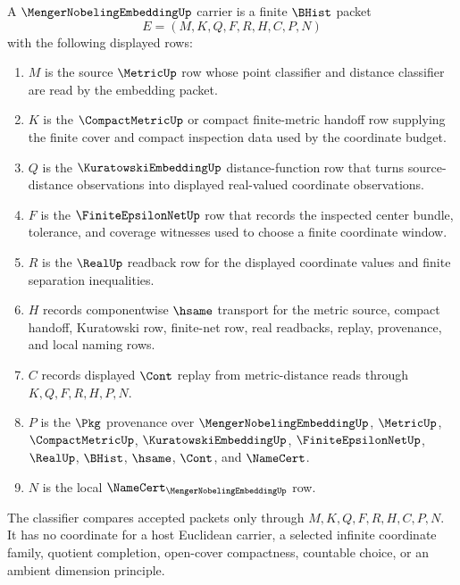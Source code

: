 \begin{definition}
\label{def:menger-nobeling-embedding-carrier}
A $\MengerNobelingEmbeddingUp$ carrier is a finite $\BHist$ packet
$$
E=(M,K,Q,F,R,H,C,P,N)
$$
with the following displayed rows:
\begin{enumerate}
\item $M$ is the source $\MetricUp$ row whose point classifier and distance classifier are read by the embedding packet.
\item $K$ is the $\CompactMetricUp$ or compact finite-metric handoff row supplying the finite cover and compact inspection data used by the coordinate budget.
\item $Q$ is the $\KuratowskiEmbeddingUp$ distance-function row that turns source-distance observations into displayed real-valued coordinate observations.
\item $F$ is the $\FiniteEpsilonNetUp$ row that records the inspected center bundle, tolerance, and coverage witnesses used to choose a finite coordinate window.
\item $R$ is the $\RealUp$ readback row for the displayed coordinate values and finite separation inequalities.
\item $H$ records componentwise $\hsame$ transport for the metric source, compact handoff, Kuratowski row, finite-net row, real readbacks, replay, provenance, and local naming rows.
\item $C$ records displayed $\Cont$ replay from metric-distance reads through $K,Q,F,R,H,P,N$.
\item $P$ is the $\Pkg$ provenance over $\MengerNobelingEmbeddingUp$, $\MetricUp$, $\CompactMetricUp$, $\KuratowskiEmbeddingUp$, $\FiniteEpsilonNetUp$, $\RealUp$, $\BHist$, $\hsame$, $\Cont$, and $\NameCert$.
\item $N$ is the local $\NameCert_{\MengerNobelingEmbeddingUp}$ row.
\end{enumerate}
The classifier compares accepted packets only through $M,K,Q,F,R,H,C,P,N$. It has no coordinate for a host Euclidean carrier, a selected infinite coordinate family, quotient completion, open-cover compactness, countable choice, or an ambient dimension principle.
\end{definition}

